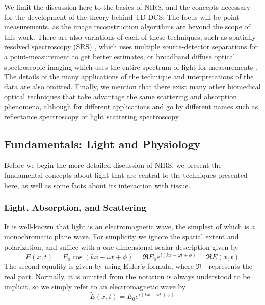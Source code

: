 We limit the discussion here to the basics of NIRS, and the concepts necessary for the development of the theory behind TD-DCS. The focus will be point-measurements, as the image reconstruction algorithms \cite{Oleary1996thesis} are beyond the scope of this work. There are also variations of each of these techniques, such as spatially resolved spectroscopy (SRS) \cite{Wolf2007}, \cite[ch. 2.4.2]{Madsen2013} which uses multiple source-detector separations for a point-measurement to get better estimates, or broadband diffuse optical spectroscopic imaging which uses the entire spectrum of light for measurements \cite[ch. 9]{Handbook}. The details of the many applications of the technique and interpretations of the data are also omitted. Finally, we mention that there exist many other biomedical optical techniques that take advantage the same scattering and absorption phenomena, although for different applications and go by different names such as reflectance spectroscopy \cite[ch. 6]{Handbook} or light scattering spectroscopy \cite[ch. 8]{Handbook}.
 
\subsection{Fundamentals: Light and Physiology} \label{sec:NIRS_fundamentals}
Before we begin the more detailed discussion of NIRS, we present the fundamental concepts about light that are central to the techniques presented here, as well as some facts about its interaction with tissue. 

\subsubsection{Light, Absorption, and Scattering}
It is well-known that light is an electromagnetic wave, the simplest of which is a monochromatic plane wave. For simplicity we ignore the spatial extent and polarization, and suffice with a one-dimensional scalar description given by%
\begin{equation} \label{eq:plane_wave_cos}
\tilde{E}(x,t) = E_0\cos(kx - \omega t + \phi) = \Re{E_0e^{i(kx-\omega t+\phi)}} = \Re{\tilde{E}(x,t)}
\end{equation}
The second equality is given by using Euler's formula, where $\Re{\cdot}$ represents the real part. Normally, it is omitted from the notation is always understood to be implicit, so we simply refer to an electromagnetic wave by
\begin{equation}\label{eq:plane_wave}
\tilde{E}(x,t) = E_0e^{i(kx-\omega t+\phi)}
\end{equation}

